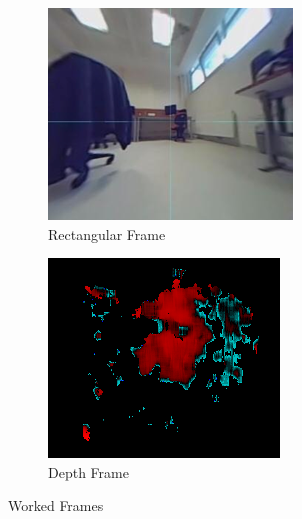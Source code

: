 \documentclass[12pt]{article}
\begin{document}
\begin{enumerate}
        \begin{figure}[H]
            \centering
            \begin{subfigure}[b]{0.4\textwidth}
                \centering
                \includegraphics[width=\textwidth]{StereoRectFrame.png}
                \caption{Rectangular Frame}
            \end{subfigure}
            \hfill
            \begin{subfigure}[b]{0.4\textwidth}
                \centering
                \includegraphics[width=\textwidth]{StereoDeptFrame.png}
                \caption{Depth Frame}
            \end{subfigure}
            \caption{Worked Frames}
        \end{figure}


\end{enumerate}
\end{document}
